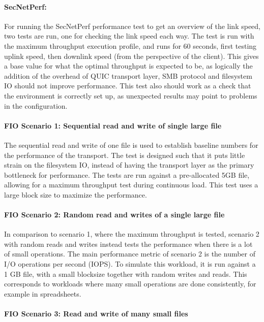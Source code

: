 \documentclass[english, 12pt, a4paper, elec, utf8, a-2b, online]{aaltothesis}
\begin{document}
\paragraph{SecNetPerf:}
For running the SecNetPerf performance test to get an overview of the link speed,
two tests are run, one for checking the link speed each way. The test is run with the maximum
throughput execution profile, and runs for 60 seconds, first testing uplink speed,
then downlink speed (from the perspective of the client). This gives a base value for
what the optimal throughput is expected to be, as logically the addition of the
overhead of QUIC transport layer, SMB protocol and filesystem IO should not improve
performance. This test also should work as a check that the environment is correctly
set up, as unexpected results may point to problems in the configuration.

\paragraph{FIO Scenario 1: Sequential read and write of single large file}

The sequential read and write of one file is used to establish baseline numbers
for the performance of the transport. The test is designed such that it puts little
strain on the filesystem IO, instead of having the transport layer as the primary 
bottleneck for performance. The tests are run against a
pre-allocated 5GB file, allowing for a maximum throughput test during continuous load.
This test uses a large block size to maximize the performance.

\paragraph{FIO Scenario 2: Random read and writes of a single large file}

In comparison to scenario 1, where the maximum throughput is tested, scenario 2
with random reads and writes instead tests the performance when there is a lot of
small operations. The main performance metric of scenario 2 is the number of I/O operations per second (IOPS).
To simulate this workload, it is run against a 1 GB file, with a small blocksize
together with random writes and reads. This corresponds
to workloads where many small operations are done consistently, for example in
spreadsheets.

\paragraph{FIO Scenario 3: Read and write of many small files}
\end{document}
